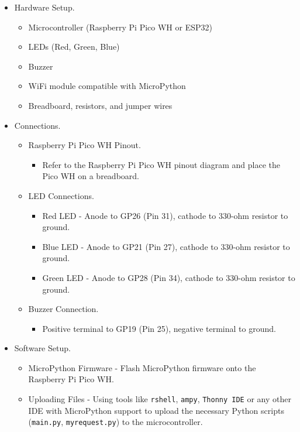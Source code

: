 \documentclass[12pt,a4paper]{report}
\begin{document}
\begin{enumerate}
		\newpage
		\begin{itemize}
			\item Hardware Setup.
				\begin{itemize}
					\item Microcontroller (Raspberry Pi Pico WH or ESP32)
					\item LEDs (Red, Green, Blue)
					\item Buzzer
					\item WiFi module compatible with MicroPython
					\item Breadboard, resistors, and jumper wires
				\end{itemize}
			\item Connections.
				\begin{itemize}
					\item Raspberry Pi Pico WH Pinout.
						\begin{itemize}
							\item Refer to the Raspberry Pi Pico WH pinout diagram and place the Pico WH on a breadboard.
						\end{itemize}
					\item LED Connections.
						\begin{itemize}
							\item Red LED - Anode to GP26 (Pin 31), cathode to 330-ohm resistor to ground.
							\item Blue LED - Anode to GP21 (Pin 27), cathode to 330-ohm resistor to ground.
							\item Green LED - Anode to GP28 (Pin 34), cathode to 330-ohm resistor to ground.
						\end{itemize}
					\item Buzzer Connection.
						\begin{itemize}
							\item Positive terminal to GP19 (Pin 25), negative terminal to ground.
						\end{itemize}
				\end{itemize}
			\item Software Setup.
				\begin{itemize}
					\item MicroPython Firmware - Flash MicroPython firmware onto the Raspberry Pi Pico WH.
					\item Uploading Files - Using tools like \verb|rshell|, \verb|ampy|, \verb|Thonny IDE| or any other IDE with MicroPython support to upload the necessary Python scripts (\verb|main.py|, \verb|myrequest.py|) to the microcontroller.

\end{itemize}
\end{itemize}
\end{enumerate}
\end{document}
